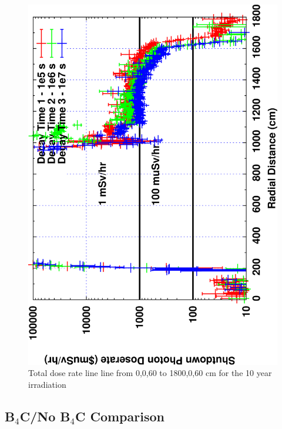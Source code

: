 \documentclass[12pt]{article}
\begin{document}
\begin{figure}[ht!]
\centering
\includegraphics[clip,scale=0.12,angle=-90]{../plots/photon_lineout/10yr/b4c_10yr.png}
\caption{Total dose rate line line from 0,0,60 to 1800,0,60 cm for the 10 year irradiation}
\label{fig:photons_10y_b4c_dose}
\end{figure}

\clearpage
\newpage
\subsection{B$_4$C/No B$_4$C Comparison}
\end{document}

